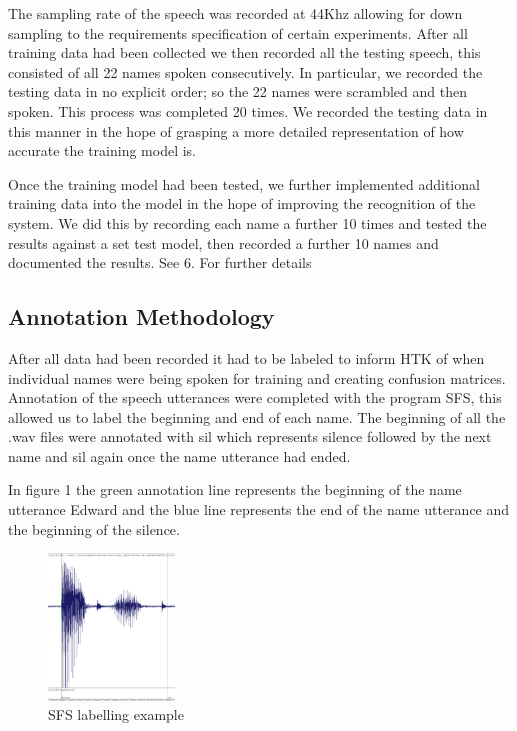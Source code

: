 \documentclass[	DIV=calc,%
							paper=a4,%
							fontsize=9.8pt,%
							twocolumn]{scrartcl}	 					%
\begin{document}
The sampling rate of the speech was recorded at  44Khz allowing for down sampling to the requirements specification of certain experiments. After all training data had been collected we then recorded all the testing speech, this consisted of all 22 names spoken consecutively. In particular, we recorded the testing data in no explicit order; so the 22 names were scrambled and then spoken. This process was completed 20 times. We recorded the testing data in this manner in the hope of grasping a more detailed representation of how accurate the training model is.

Once the training model had been tested, we further implemented additional training data  into the model in the hope of improving the recognition of the system. We did this by recording each name a further 10 times and tested the results against a set test model, then recorded a further 10 names and documented the results. See 6. For further details


\subsection{Annotation Methodology}
After all data had been recorded it had to be labeled to inform HTK of when individual names were being spoken for training and creating confusion matrices. Annotation of the speech utterances were completed with the program SFS, this allowed us to label the beginning and end of each name. The beginning of all the .wav files were annotated with sil which represents silence followed by the next name and sil again once the name utterance had ended.

In figure 1 the green annotation line represents the beginning of the name utterance Edward and the blue line represents the end of the name utterance and the beginning of the silence.

\begin{figure}[ht]
	\centering
	\includegraphics[width=0.3\textwidth]{labelling}
	\captionsetup{justification=centering}
	\caption{SFS labelling example}
\end{figure}
\end{document}
